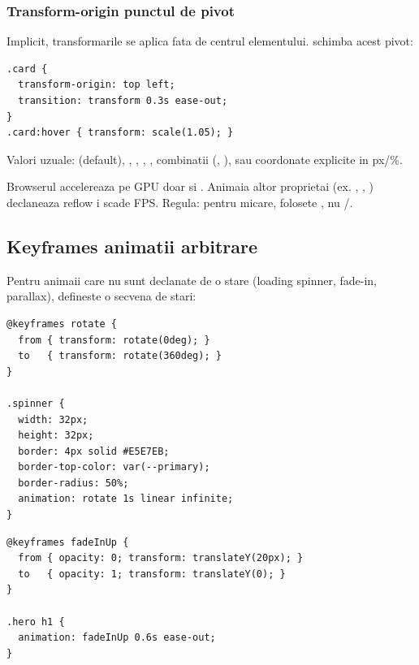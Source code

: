 \subsubsection{Transform-origin \textendash{} punctul de pivot}

Implicit, transformarile se aplica fata de centrul elementului.  schimba acest pivot:

\begin{lstlisting}[style=css, caption={Card care se ,,deschide'' din coltul stanga-sus}]
.card {
  transform-origin: top left;
  transition: transform 0.3s ease-out;
}
.card:hover { transform: scale(1.05); }
\end{lstlisting}

Valori uzuale:  (default), , , , , combinatii (, ), sau coordonate explicite in px/\%.

\begin{ponturi}[Performance]
Browserul accelereaza pe GPU doar  si . Animaia altor proprietai (ex. , , ) declaneaza reflow i scade FPS. Regula: pentru micare, folosete , nu /.
\end{ponturi}

\subsection{Keyframes \textendash{} animatii arbitrare}

Pentru animaii care nu sunt declanate de o stare (loading spinner, fade-in, parallax),  defineste o secvena de stari:

\begin{lstlisting}[style=css, caption={Spinner infinit}]
@keyframes rotate {
  from { transform: rotate(0deg); }
  to   { transform: rotate(360deg); }
}

.spinner {
  width: 32px;
  height: 32px;
  border: 4px solid #E5E7EB;
  border-top-color: var(--primary);
  border-radius: 50%;
  animation: rotate 1s linear infinite;
}
\end{lstlisting}

\begin{lstlisting}[style=css, caption={Fade-in pentru titlu hero}]
@keyframes fadeInUp {
  from { opacity: 0; transform: translateY(20px); }
  to   { opacity: 1; transform: translateY(0); }
}

.hero h1 {
  animation: fadeInUp 0.6s ease-out;
}
\end{lstlisting}

